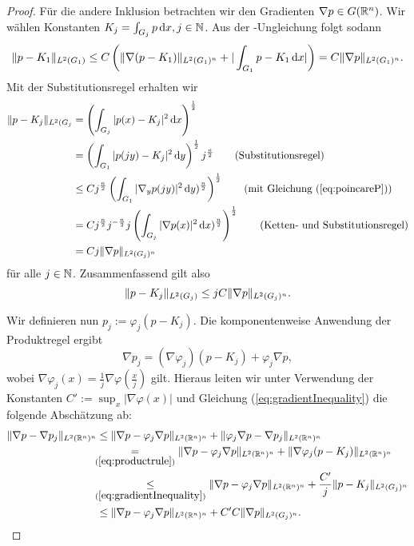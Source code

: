 \begin{proof}
  Für die andere Inklusion betrachten wir den Gradienten $\nabla p \in G(\mathbb{R}^n)$.
  Wir wählen Konstanten $K_j = \int_{G_j} p \, {\operatorname{d}\!{x}}, j \in \mathbb{N}$.
  Aus der \poincare\hyp{}Ungleichung \cite[S.44, Lemma 1.1.2]{sohr2001navier} folgt sodann
  \begin{equation}
    \label{eq:poincareP}
  \lVert p - K_1 \rVert_{L^2(G_1)} \leq C \left(\lVert \nabla (p - K_1) \rVert_{L^2(G_1)^n} + | \int_{G_1} p - K_1 \, {\operatorname{d}\!{x}} |\right) =  C \lVert \nabla p \rVert_{L^2(G_1)^n}.
\end{equation}
  Mit der Substitutionsregel erhalten wir
\begin{align*}
  \norm{p - K_j}_{L^2(G_j} 
  &= \left( \int_{G_j} |p(x) - K_j|^2 \d x \right)^\frac{1}{2} \\
  &= \left( \int_{G_1} |p(jy) - K_j|^2 \d y \right)^\frac{1}{2} j^\frac{n}{2} \tag{Substitutionsregel}\\
  &\leq C j^{\frac{n}{2}}\left( \int_{G_1} |\nabla_y p(jy) |^2 \d y )^{\frac{n}{2}} \right)^{\frac{1}{2}} \tag{mit Gleichung (\ref{eq:poincareP})}\\
  &= C j^{\frac{n}{2}}j^{-\frac{n}{2}}j \left( \int_{G_j} |\nabla p(x) |^2 \d x )^{\frac{n}{2}} \right)^{\frac{1}{2}} \tag{Ketten- und Substitutionsregel} \\
  &= C j \norm{\nabla p}_{L^2(G_j)^n}
\end{align*}
  für alle $j \in \mathbb{N}$.
  Zusammenfassend gilt also
  \begin{equation}
    \label{eq:gradientInequality}
    \lVert p - K_j \rVert_{L^2(G_j)} \leq j C\lVert \nabla p \rVert_{L^2(G_j)^n}.
  \end{equation}

  Wir definieren nun $p_j := \varphi_j (p - K_j)$.
  Die komponentenweise Anwendung der Produktregel ergibt 
  \begin{equation}
    \label{eq:productrule}
    \nabla p_j =  (\nabla \varphi_j)(p - K_j) + \varphi_j \nabla p,
  \end{equation}
  wobei $\nabla \varphi_j(x) = \frac{1}{j} \nabla \varphi (\frac{x}{j})$ gilt.
  Hieraus leiten wir unter Verwendung der Konstanten $C' := \sup_x |\nabla \varphi(x)|$ und Gleichung (\ref{eq:gradientInequality}) die folgende Abschätzung ab:
  \begin{align}
    \norm{\nabla p - \nabla p_j}_{L^2(\R^n)^n}
    &\leq \norm{\nabla p - \varphi_j \nabla p}_{L^2(\R^n)^n} + \norm{\varphi_j \nabla p - \nabla p_j}_{L^2(\R^n)^n} \nonumber\\
    &\hspace{-0.15cm}\underset{(\ref{eq:productrule})}{=} \norm{\nabla p - \varphi_j \nabla p}_{L^2(\R^n)^n}    + \norm{\nabla\varphi_j (p - K_j)}_{L^2(\R^n)^n} \nonumber\\
    &\hspace{-0.15cm}\underset{(\ref{eq:gradientInequality})} \leq \norm{\nabla p - \varphi_j \nabla p}_{L^2(\R^n)^n} + \frac{C'}{j} \norm{p - K_j}_{L^2(G_j)^n}\nonumber\\
    &\leq \norm{\nabla p - \varphi_j \nabla p}_{L^2(\R^n)^n} + C'C \norm{\nabla p}_{L^2(G_j)^n} \label{eq:gradDiff}.
  \end{align}


\end{proof}
